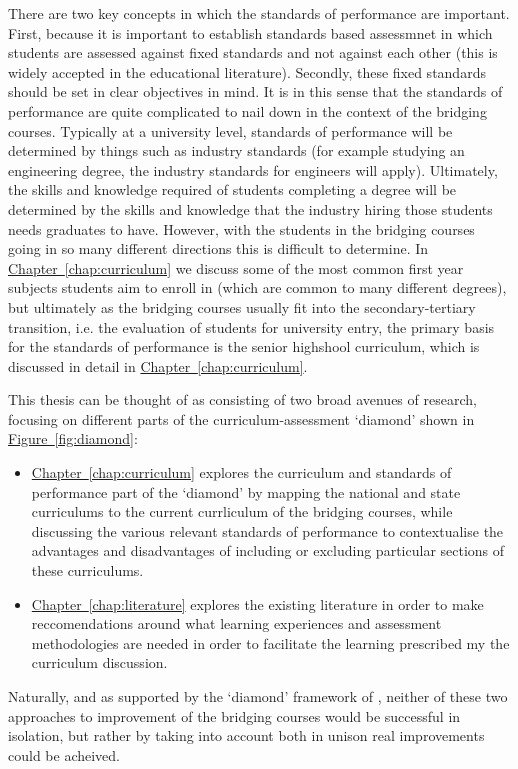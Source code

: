 \documentclass[twoside,12pt,a4paper]{report}
\newcommand{\refchap}[1]{\hyperref[chap:#1]{Chapter~\ref{chap:#1}}}
\newcommand{\reffig}[1]{\hyperref[fig:#1]{Figure~\ref{fig:#1}}}
\begin{document}
There are two key concepts in which the standards of performance are important. First, because it is important to establish standards based assessmnet in which students are assessed against fixed standards and not against each other (this is widely accepted in the educational literature). Secondly, these fixed standards should be set in clear objectives in mind. It is in this sense that the standards of performance are quite complicated to nail down in the context of the bridging courses. Typically at a university level, standards of performance will be determined by things such as industry standards (for example studying an engineering degree, the industry standards for engineers will apply). Ultimately, the skills and knowledge required of students completing a degree will be determined by the skills and knowledge that the industry hiring those students needs graduates to have. However, with the students in the bridging courses going in so many different directions this is difficult to determine. In \refchap{curriculum} we discuss some of the most common first year subjects students aim to enroll in (which are common to many different degrees), but ultimately as the bridging courses usually fit into the secondary-tertiary transition, i.e. the evaluation of students for university entry, the primary basis for the standards of performance is the senior highshool curriculum, which is discussed in detail in \refchap{curriculum}.

This thesis can be thought of as consisting of two broad avenues of research, focusing on different parts of the curriculum-assessment `diamond' shown in \reffig{diamond}:
\begin{itemize}
	\item \refchap{curriculum} explores the curriculum and standards of performance part of the `diamond' by mapping the national and state curriculums to the current currliculum of the bridging courses, while discussing the various relevant standards of performance to contextualise the advantages and disadvantages of including or excluding particular sections of these curriculums.
	\item \refchap{literature} explores the existing literature in order to make reccomendations around what learning experiences and assessment methodologies are needed in order to facilitate the learning prescribed my the curriculum discussion. 
\end{itemize}
Naturally, and as supported by the `diamond' framework of , neither of these two approaches to improvement of the bridging courses would be successful in isolation, but rather by taking into account both in unison real improvements could be acheived.
\end{document}
